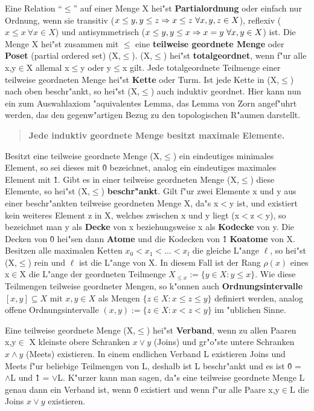 Eine Relation "`$\leq$"' auf einer Menge X hei"st {\bf Partialordnung} oder
einfach nur Ordnung, wenn sie transitiv ($x\leq y, y\leq z\Rightarrow x\leq z~\forall
x,y,z\in X$), reflexiv ($x\leq x~\forall x\in X$) und antisymmetrisch ($x\leq y,
y\leq x\Rightarrow x = y~\forall x,y\in X$) ist. Die Menge X hei"st zusammen mit
$\leq$ eine {\bf teilweise geordnete Menge} oder {\bf Poset} (partial ordered
set) (X,$\leq$).
(X,$\leq$) hei"st {\bf totalgeordnet}, wenn f"ur alle
x,y$\in$X allemal x$\leq$y oder y$\leq$x gilt. Jede totalgeordnete Teilmenge
einer teilweise geordneten Menge hei"st {\bf Kette} oder Turm.
 Ist jede Kette in (X,$\leq$) nach oben beschr"ankt, so hei"st
(X,$\leq$) auch induktiv geordnet.
Hier kann nun ein zum Auswahlaxiom "aquivalentes Lemma, das Lemma von Zorn
angef"uhrt werden, das den gegenw"artigen Bezug zu den topologischen R"aumen
darstellt.
\begin{quote}
{\bf Jede induktiv geordnete Menge besitzt maximale Elemente.}
\end{quote}
Besitzt eine teilweise geordnete Menge (X,$\leq$) ein eindeutiges minimales
Element, so sei dieses mit \^0 bezeichnet, analog ein eindeutiges maximales
Element mit \^1. Gibt es in einer teilweise geordneten Menge (X,$\leq$) diese
Elemente, so hei"st (X,$\leq$) {\bf beschr"ankt}. Gilt f"ur zwei Elemente x
und y aus einer beschr"ankten teilweise geordneten Menge X, da"s x$<$y ist, und
existiert kein weiteres Element z in X, welches zwischen x und y liegt
(x$<$z$<$y), so bezeichnet man y als {\bf Decke} von x
beziehungsweise x als {\bf Kodecke} von y. Die Decken von \^0 hei"sen dann
{\bf Atome} und die Kodecken von \^1 {\bf Koatome} von X.
Besitzen alle maximalen Ketten $x_0<x_1<\ldots<x_l$ die gleiche L"ange $\ell$,
so hei"st (X,$\leq$) rein und $\ell$ ist die L"ange
von X. In diesem Fall ist der Rang $\rho(x)$ eines x$\in$X die L"ange der
geordneten Teilmenge $X_{\leq x}:=\{y\in X:y\leq x\}$. Wie diese Teilmengen
teilweise geordneter Mengen, so k"onnen auch {\bf Ordnungsintervalle}
 $[x,y]\subseteq X$ mit $x,y\in X$ als Mengen
$\{z\in X:x\leq z\leq y\}$ definiert werden, analog offene Ordnungsintervalle
$(x,y) := \{z\in X:x<z<y\}$ im "ublichen Sinne.

Eine teilweise geordnete Menge (X,$\leq$) hei"st {\bf Verband},
wenn zu allen Paaren x,y$\in$ X kleinste obere Schranken $x\vee y$ (Joins) und
gr"o"ste untere Schranken $x\wedge y$ (Meets) existieren. In einem endlichen
Verband L existieren Joins und Meets f"ur beliebige Teilmengen von L, deshalb
ist L beschr"ankt und es ist \^0 = $\wedge$L und \^1 = $\vee$L.
K"urzer kann man sagen, da"s eine teilweise geordnete Menge L genau dann ein
Verband ist, wenn \^0 existiert und wenn f"ur alle Paare x,y$\in$L die Joins
$x\vee y$ existieren. 

